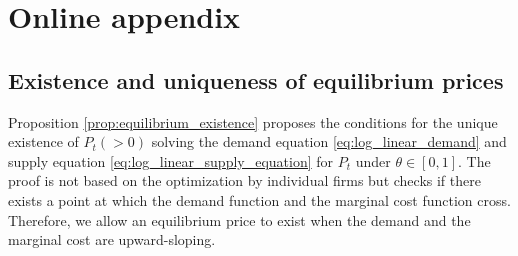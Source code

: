 \documentclass[11pt, a4paper]{article}
\begin{document}
\newpage



\newpage
\appendix

\section{Online appendix}
\subsection{Existence and uniqueness of equilibrium prices}\label{sec:appendix_proof}

Proposition \ref{prop:equilibrium_existence} proposes the conditions for the unique existence of $P_{t}(>0)$ solving the demand equation \eqref{eq:log_linear_demand} and supply equation \eqref{eq:log_linear_supply_equation} for $P_{t}$ under $\theta\in[0,1]$.
The proof is not based on the optimization by individual firms but checks if there exists a point at which the demand function and the marginal cost function cross.
Therefore, we allow an equilibrium price to exist when the demand and the marginal cost are upward-sloping.
    
\end{document}
